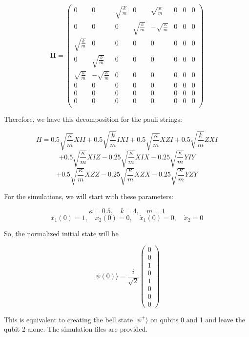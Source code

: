 \documentclass{article}
\begin{document}
$$\textbf{H} = \begin{pmatrix}
    0 & 0 & \sqrt{\frac{k}{m}} & 0 & \sqrt{\frac{\kappa}{m}} & 0 & 0 & 0 \\
    0 & 0 & 0 & \sqrt{\frac{k}{m}} & -\sqrt{\frac{\kappa}{m}} & 0 & 0 & 0 \\
    \sqrt{\frac{k}{m}} & 0 & 0 & 0 & 0 & 0 & 0 & 0 \\
    0 & \sqrt{\frac{k}{m}} & 0 & 0 & 0 & 0 & 0 & 0 \\
    \sqrt{\frac{\kappa}{m}} & -\sqrt{\frac{\kappa}{m}} & 0 & 0 & 0 & 0 & 0 & 0 \\
    0 & 0 & 0 & 0 & 0 & 0 & 0 & 0 \\
    0 & 0 & 0 & 0 & 0 & 0 & 0 & 0 \\
    0 & 0 & 0 & 0 & 0 & 0 & 0 & 0 \\
\end{pmatrix}$$

Therefore, we have this decomposition for the pauli strings:

$$H = 0.5\sqrt{\frac{\kappa}{m}}XII + 0.5\sqrt{\frac{k}{m}}IXI + 0.5\sqrt{\frac{\kappa}{m}}XZI + 0.5\sqrt{\frac{k}{m}}ZXI $$
$$+ 0.5\sqrt{\frac{\kappa}{m}}XIZ - 0.25\sqrt{\frac{\kappa}{m}}XIX - 0.25\sqrt{\frac{\kappa}{m}}YIY$$
$$+ 0.5\sqrt{\frac{\kappa}{m}}XZZ - 0.25\sqrt{\frac{\kappa}{m}}XZX - 0.25\sqrt{\frac{\kappa}{m}}YZY$$

For the simulations, we will start with these parameters:

$$\kappa = 0.5, \quad k = 4, \quad m = 1$$
$$x_1(0) = 1, \quad x_2(0) = 0, \quad \dot{x}_1(0) = 0, \quad \dot{x}_2 = 0$$

So, the normalized initial state will be

$$| \psi(0) \rangle = \frac{i}{\sqrt{2}}\begin{pmatrix}
    0 \\
    0 \\
    1 \\
    0 \\
    1 \\
    0 \\
    0 \\
    0
\end{pmatrix}$$

This is equivalent to creating the bell state $|\psi^+\rangle$ on qubits 0 and 1 and leave the qubit 2 alone. The simulation files are provided.
\end{document}
